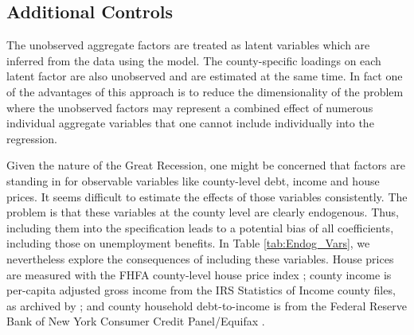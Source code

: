 \documentclass[12pt]{article}
\newcommand{\1}{\mathbf{1}}
\begin{document}
\begin{appendix}
\subsection{Additional Controls}

The unobserved aggregate factors are treated as latent variables which are inferred from the data using the model. The county-specific loadings on each latent factor are also unobserved and are estimated at the same time. In fact one of the advantages of this approach is to reduce the dimensionality of the problem where the unobserved factors may represent a combined effect of numerous individual aggregate variables that one cannot include individually into the regression.

Given the nature of the Great Recession, one might be concerned that factors are standing in for observable variables like county-level debt, income and house prices. It seems difficult to estimate the effects of those variables consistently. The problem is that these variables at the county level are clearly endogenous. Thus, including them into the specification leads to a potential bias of all coefficients, including those on unemployment benefits. In Table \ref{tab:Endog_Vars}, we nevertheless explore the consequences of including these variables. House prices are measured with the FHFA county-level house price index \citep{data:fhfa-hpi}; county income is per-capita adjusted gross income from the IRS Statistics of Income county files, as archived by \citet{data:kmv-jpube}; and county household debt-to-income is from the Federal Reserve Bank of New York Consumer Credit Panel/Equifax \citep{data:nyfed-ccp}.


\end{appendix}
\end{document}
